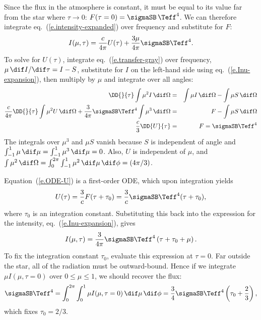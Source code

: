 Since the flux in the atmosphere is constant, it must be equal to its value far from the star where $\tau\to0$: $F(\tau=0) = \sigmaSB\,\Teff^{4}$. We can therefore integrate eq.~(\ref{e.intensity-expanded}) over frequency and substitute for $F$:
\begin{equation}
\label{e.Inu-expansion}
	I(\mu,\tau) = \frac{c}{4\pi} U(\tau) + \frac{3\mu}{4\pi}\sigmaSB\Teff^{4}.
\end{equation}
To solve for $U(\tau)$, integrate eq.~(\ref{e.transfer-gray}) over frequency,
$\mu\,\dif I/\dif\tau = I-S$, substitute for $I$ on the left-hand side using eq.~(\ref{e.Inu-expansion}), then multiply by $\mu$ and integrate over all angles:
\begin{eqnarray}
	\DD{}{\tau}\int\mu^{2}I\,\dif\Omega &=& \int\mu I\,\dif\Omega
		- \int \mu S\,\dif\Omega\nonumber\\
	\frac{c}{4\pi}\DD{}{\tau} \int \mu^{2}U\,\dif\Omega 
		+ \frac{3}{4\pi}\sigmaSB\Teff^{4}\int\mu^{3}\,\dif\Omega &=& F - \int \mu S\,\dif\Omega\nonumber\\
	\frac{c}{3}\DD{U}{\tau} &=& F = \sigmaSB\Teff^{4}
\label{e.ODE-U}
\end{eqnarray}
The integrals over $\mu^{3}$ and $\mu S$ vanish because $S$ is independent of angle and $\int_{-1}^{1} \mu\,\dif\mu = \int_{-1}^{1}\mu^{3}\,\dif\mu = 0$. Also, $U$ is independent of $\mu$, and $\int\mu^{2}\,\dif\Omega = \int_{0}^{2\pi}\int_{-1}^{1}\mu^{2}\,\dif\mu\,\dif\phi = (4\pi/3)$.

Equation~(\ref{e.ODE-U}) is a first-order ODE, which upon integration yields
\begin{equation}\label{e.energy-density-Eddington}
	U(\tau) = \frac{3}{c}F(\tau + \tau_{0}) = \frac{3}{c}\sigmaSB\Teff^{4} (\tau+\tau_{0}),
\end{equation}
where $\tau_{0}$ is an integration constant. Substituting this back into the expression for the intensity, eq.~(\ref{e.Inu-expansion}), gives
\[
	I(\mu,\tau) = \frac{3}{4\pi}\sigmaSB\Teff^{4}\left(\tau + \tau_{0} + \mu\right).
\]
To fix the integration constant $\tau_{0}$, evaluate this expression at $\tau=0$. Far outside the star, all of the radiation must be outward-bound. Hence if we integrate $\mu I(\mu,\tau=0)$ over $0\le\mu\le 1$, we should recover the flux:
\[
	\sigmaSB\Teff^{4} = \int_{0}^{2\pi}\int_{0}^{1} \mu I(\mu,\tau=0)\,\dif\mu\,\dif\phi
	= \frac{3}{4}\sigmaSB\Teff^{4}\left(\tau_{0} + \frac{2}{3}\right),
\]
which fixes $\tau_{0} = 2/3$.

